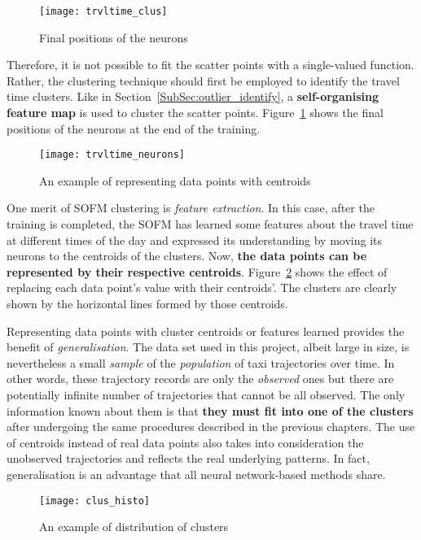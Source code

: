 \begin{figure}[h!]
\centering
\texttt{[image: trvltime\_clus]} 
\caption{Final positions of the neurons}\label{Fig:trvltime_clus}
\end{figure}

Therefore, it is not possible to fit the scatter points with a single-valued function. Rather, the clustering technique should first be employed to identify the travel time clusters. Like in Section~\ref{SubSec:outlier_identify}, a \textbf{self-organising feature map} is used to cluster the scatter points. Figure~\ref{Fig:trvltime_clus} shows the final positions of the neurons at the end of the training.

\begin{figure}[h!]
\texttt{[image: trvltime\_neurons]}
\centering
\caption{An example of representing data points with centroids}\label{Fig:trvltime_neurons}
\end{figure}

One merit of SOFM clustering is \emph{feature extraction}. In this case, after the training is completed, the SOFM has learned some features about the travel time at different times of the day and expressed its understanding by moving its neurons to the centroids of the clusters. Now, \textbf{the data points can be represented by their respective centroids}. Figure~\ref{Fig:trvltime_neurons} shows the effect of replacing each data point's value with their centroids'. The clusters are clearly shown by the horizontal lines formed by those centroids. 

Representing data points with cluster centroids or features learned provides the benefit of \emph{generalisation}. The data set used in this project, albeit large in size, is nevertheless a small \emph{sample} of the \emph{population} of taxi trajectories over time. In other words, these trajectory records are only the \emph{observed} ones but there are potentially infinite number of trajectories that cannot be all observed. The only information known about them is that \textbf{they must fit into one of the clusters} after undergoing the same procedures described in the previous chapters. The use of centroids instead of real data points also takes into consideration the unobserved trajectories and reflects the real underlying patterns. In fact, generalisation is an advantage that all neural network-based methods share. 

\begin{figure}[h!]
\texttt{[image: clus\_histo]}
\centering
\caption{An example of distribution of clusters}\label{Fig:clus_histo}
\end{figure}

